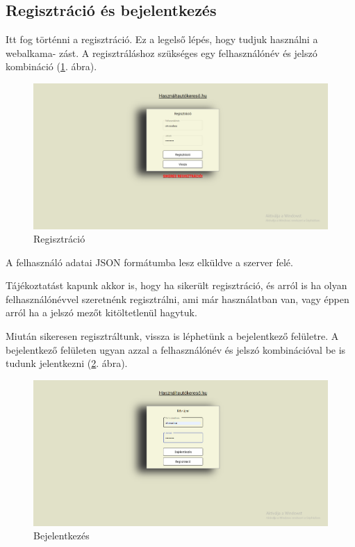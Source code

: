 
\subsection{Regisztráció és bejelentkezés}
Itt fog történni a regisztráció. Ez a legelső lépés, hogy tudjuk használni a webalkama-
zást.
A regisztráláshoz szükséges egy felhasználónév és jelszó kombináció (\ref{fig:regisztracio}. ábra).

\begin{figure}[h]
\centering
\includegraphics[scale=0.37]{images/regisztracio.png}
\caption{Regisztráció}
\label{fig:regisztracio}
\end{figure}

A felhasználó adatai JSON formátumba lesz elküldve a szerver felé.

Tájékoztatást kapunk akkor is, hogy ha sikerült regisztráció, és arról is ha olyan felhasználónévvel szeretnénk regisztrálni, ami már használatban van, vagy éppen arról ha a jelszó mezőt kitöltetlenül hagytuk.

Miután sikeresen regisztráltunk, vissza is léphetünk a bejelentkező felületre.
A bejelentkező felületen ugyan azzal a felhasználónév és jelszó kombinációval be is tudunk jelentkezni (\ref{fig:bejelentkezes}. ábra).

\begin{figure}[h]
\centering
\includegraphics[scale=0.37]{images/bejelentkezes.png}
\caption{Bejelentkezés}
\label{fig:bejelentkezes}
\end{figure}

